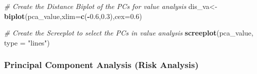 \documentclass[11pt,a4paper,]{article}
\newenvironment{Shaded}{\begin{snugshade}}{\end{snugshade}}
\newcommand{\CommentTok}[1]{\textcolor[rgb]{0.56,0.35,0.01}{\textit{#1}}}
\newcommand{\DataTypeTok}[1]{\textcolor[rgb]{0.13,0.29,0.53}{#1}}
\newcommand{\DecValTok}[1]{\textcolor[rgb]{0.00,0.00,0.81}{#1}}
\newcommand{\FloatTok}[1]{\textcolor[rgb]{0.00,0.00,0.81}{#1}}
\newcommand{\KeywordTok}[1]{\textcolor[rgb]{0.13,0.29,0.53}{\textbf{#1}}}
\newcommand{\NormalTok}[1]{#1}
\newcommand{\OperatorTok}[1]{\textcolor[rgb]{0.81,0.36,0.00}{\textbf{#1}}}
\newcommand{\StringTok}[1]{\textcolor[rgb]{0.31,0.60,0.02}{#1}}
\begin{document}
\begin{Shaded}
\begin{Highlighting}[]
\CommentTok{# Create the Distance Biplot of the PCs for value analysis}
\NormalTok{dis_va<-}\KeywordTok{biplot}\NormalTok{(pca_value,}\DataTypeTok{xlim=}\KeywordTok{c}\NormalTok{(}\OperatorTok{-}\FloatTok{0.6}\NormalTok{,}\FloatTok{0.3}\NormalTok{),}\DataTypeTok{cex=}\FloatTok{0.6}\NormalTok{)}
\end{Highlighting}
\end{Shaded}

\begin{Shaded}
\end{Shaded}

\begin{Shaded}
\begin{Highlighting}[]
\CommentTok{# Create the Screeplot to select the PCs in value analysis}
\KeywordTok{screeplot}\NormalTok{(pca_value, }\DataTypeTok{type =} \StringTok{"lines"}\NormalTok{)}
\end{Highlighting}
\end{Shaded}

\hypertarget{principal-component-analysis-risk-analysis}{%
\subsubsection{Principal Component Analysis (Risk Analysis)}\label{principal-component-analysis-risk-analysis}}

\begin{Shaded}
\end{Shaded}
\end{document}
